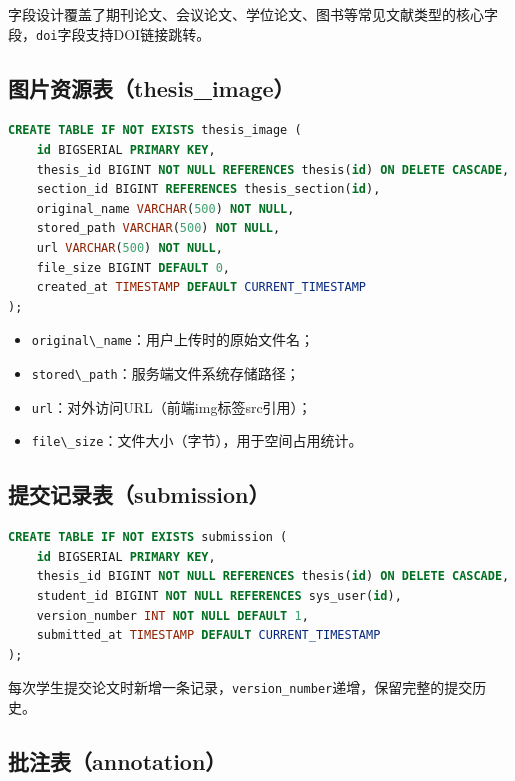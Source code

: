\documentclass{../softeng}
\begin{document}
字段设计覆盖了期刊论文、会议论文、学位论文、图书等常见文献类型的核心字段，\verb|doi|字段支持DOI链接跳转。

\subsection{图片资源表（thesis\_image）}

\begin{lstlisting}[language=SQL,caption={thesis\_image 建表语句}]
CREATE TABLE IF NOT EXISTS thesis_image (
    id BIGSERIAL PRIMARY KEY,
    thesis_id BIGINT NOT NULL REFERENCES thesis(id) ON DELETE CASCADE,
    section_id BIGINT REFERENCES thesis_section(id),
    original_name VARCHAR(500) NOT NULL,
    stored_path VARCHAR(500) NOT NULL,
    url VARCHAR(500) NOT NULL,
    file_size BIGINT DEFAULT 0,
    created_at TIMESTAMP DEFAULT CURRENT_TIMESTAMP
);
\end{lstlisting}

\begin{itemize}
    \item \verb|original\_name|：用户上传时的原始文件名；
    \item \verb|stored\_path|：服务端文件系统存储路径；
    \item \verb|url|：对外访问URL（前端img标签src引用）；
    \item \verb|file\_size|：文件大小（字节），用于空间占用统计。
\end{itemize}

\subsection{提交记录表（submission）}

\begin{lstlisting}[language=SQL,caption={submission 建表语句}]
CREATE TABLE IF NOT EXISTS submission (
    id BIGSERIAL PRIMARY KEY,
    thesis_id BIGINT NOT NULL REFERENCES thesis(id) ON DELETE CASCADE,
    student_id BIGINT NOT NULL REFERENCES sys_user(id),
    version_number INT NOT NULL DEFAULT 1,
    submitted_at TIMESTAMP DEFAULT CURRENT_TIMESTAMP
);
\end{lstlisting}

每次学生提交论文时新增一条记录，\verb|version_number|递增，保留完整的提交历史。

\subsection{批注表（annotation）}
\end{document}
